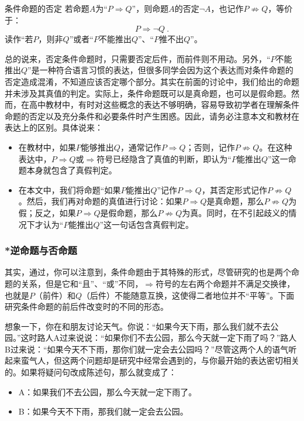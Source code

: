 \begin{definition}{条件命题的否定}
若命题$A$为“$P\Rightarrow Q$”，则命题$A$的否定$\lnot A$，也记作$P\not\Rightarrow Q$，等价于：
\begin{equation}
P\Rightarrow \lnot Q~.
\end{equation}
读作“若$P$，则非$Q$”或者“$P$不能推出$Q$”、“$P$推不出$Q$”。
\end{definition}

总的说来，否定条件命题时，只需要否定后件，而前件则不用动。另外，“$P$不能推出$Q$”是一种符合语言习惯的表达，但很多同学会因为这个表达而对条件命题的否定造成混淆，不知道应该否定哪个部分。其实在前面的讨论中，我们给出的命题并未涉及其真值的判定。实际上，条件命题既可以是真命题，也可以是假命题。然而，在高中教材中，有时对这些概念的表达不够明确，容易导致初学者在理解条件命题的否定以及充分条件和必要条件时产生困惑。因此，请务必注意本文和教材在表达上的区别。具体说来：
\begin{itemize}
\item 在教材中，如果$P$能够推出$Q$，通常记作$P\Rightarrow Q$；否则，记作$P\not\Rightarrow Q$。在这种表达中，$P\Rightarrow Q$或$\Rightarrow$符号已经隐含了真值的判断，即认为“$P$能推出$Q$”这一命题本身就包含了真假判定。
\item 在本文中，我们将命题“如果$P$能推出$Q$”记作$P\Rightarrow Q$，其否定形式记作$P\not\Rightarrow Q$。然后，我们再对命题的真值进行讨论：如果$P\Rightarrow Q$是真命题，那么$P\not\Rightarrow Q$为假；反之，如果$P\Rightarrow Q$是假命题，那么$P\not\Rightarrow Q$为真。同时，在不引起歧义的情况下才认为“$P$能推出$Q$”这一句话包含真假判定。
\end{itemize}

\subsubsection{*逆命题与否命题}

其实，通过，你可以注意到，条件命题由于其特殊的形式，尽管研究的也是两个命题的关系，但是它和“且”、“或”不同，$\Rightarrow$符号的左右两个命题并不满足交换律，也就是$P$（前件）和$Q$（后件）不能随意互换，这使得二者地位并不“平等”。下面研究条件命题的前后件改变时的不同的形态。

想象一下，你在和朋友讨论天气。你说：“如果今天下雨，那么我们就不去公园。”这时路人A过来说说：“如果你们不去公园，那么今天就一定下雨了吗？”路人B过来说：“如果今天不下雨，那你们就一定会去公园吗？”尽管这两个人的语气听起来蛮气人，但这两个问题却是研究中经常会遇到的，与你最开始的表达密切相关的。如果将疑问句改成陈述句，那么就变成了：
\begin{itemize}
\item A：如果我们不去公园，那么今天就一定下雨了。
\item B：如果今天不下雨，那我们就一定会去公园。
\end{itemize}


